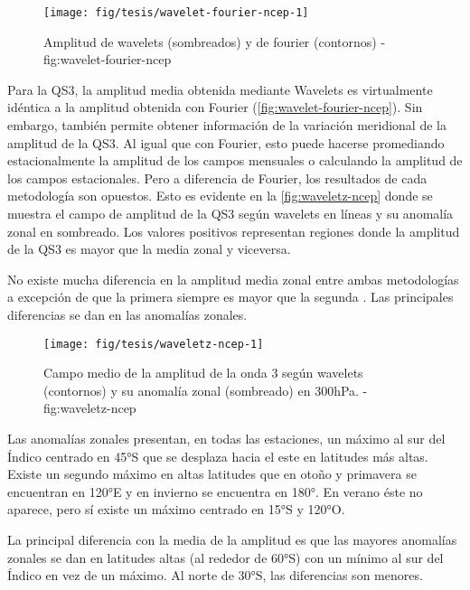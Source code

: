 \documentclass[spanish,a4paper]{book}
\begin{document}
\begin{figure}

{\centering \texttt{[image: fig/tesis/wavelet-fourier-ncep-1]} 

}

\caption{Amplitud de wavelets (sombreados) y de fourier (contornos) - fig:wavelet-fourier-ncep}\label{fig:wavelet-fourier-ncep}
\end{figure}

Para la QS3, la amplitud media obtenida mediante Wavelets
 es virtualmente idéntica a la
amplitud obtenida con Fourier (\autoref{fig:wavelet-fourier-ncep}). Sin
embargo, también permite obtener información de la variación meridional
de la amplitud de la QS3. Al igual que con Fourier, esto puede hacerse
promediando estacionalmente la amplitud de los campos mensuales o
calculando la amplitud de los campos estacionales. Pero a diferencia de
Fourier, los resultados de cada metodología son opuestos. Esto es
evidente en la \autoref{fig:waveletz-ncep} donde se muestra el campo de
amplitud de la QS3 según wavelets en líneas y su anomalía zonal en
sombreado. Los valores positivos representan regiones donde la amplitud
de la QS3 es mayor que la media zonal y viceversa.

No existe mucha diferencia en la amplitud media zonal entre ambas
metodologías a excepción de que la primera siempre es mayor que la
segunda
.
Las principales diferencias se dan en las anomalías zonales.

\begin{figure}

{\centering \texttt{[image: fig/tesis/waveletz-ncep-1]} 

}

\caption{Campo medio de la amplitud de la onda 3 según wavelets (contornos) y su anomalía zonal (sombreado) en 300hPa. - fig:waveletz-ncep}\label{fig:waveletz-ncep}
\end{figure}

Las anomalías zonales presentan, en todas las estaciones, un máximo al
sur del Índico centrado en 45°S que se desplaza hacia el este en
latitudes más altas. Existe un segundo máximo en altas latitudes que en
otoño y primavera se encuentran en 120°E y en invierno se encuentra en
180°. En verano éste no aparece, pero sí existe un máximo centrado en
15°S y 120°O.

La principal diferencia con la media de la amplitud es que las mayores
anomalías zonales se dan en latitudes altas (al rededor de 60°S) con un
mínimo al sur del Índico en vez de un máximo. Al norte de 30°S, las
diferencias son menores.
\end{document}
